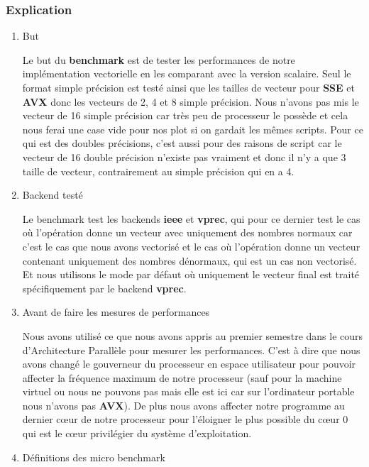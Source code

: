 \documentclass[11pt, letterpaper]{article}
\begin{document}
\subsubsection{Explication}
\label{sec:org72f10cb}
\begin{enumerate}
\item But
\label{sec:org0732b49}

Le but du \textbf{benchmark} est de tester les performances de notre implémentation
vectorielle en les comparant avec la version scalaire. Seul le format
simple précision est testé ainsi que les tailles de vecteur pour \textbf{SSE} et
\textbf{AVX} donc les vecteurs de 2, 4 et 8 simple précision. Nous n'avons pas mis
le vecteur de 16 simple précision car très peu de processeur le possède et
cela nous ferai une case vide pour nos plot si on gardait les mêmes
scripts. Pour ce qui est des doubles précisions, c'est aussi pour des
raisons de script car le vecteur de 16 double précision n'existe pas
vraiment et donc il n'y a que 3 taille de vecteur, contrairement au simple
précision qui en a 4.

\item Backend testé
\label{sec:orgb911297}

Le benchmark test les backends \textbf{ieee} et \textbf{vprec}, qui pour ce dernier test
le cas où l'opération donne un vecteur avec uniquement des nombres normaux
car c'est le cas que nous avons vectorisé et le cas où l'opération donne un
vecteur contenant uniquement des nombres dénormaux, qui est un cas non
vectorisé. Et nous utilisons le mode par défaut où uniquement le vecteur
final est traité spécifiquement par le backend \textbf{vprec}.

\item Avant de faire les mesures de performances
\label{sec:orgf031fa9}

Nous avons utilisé ce que nous avons appris au premier semestre dans le
cours d'Architecture Parallèle pour mesurer les performances. C'est à dire
que nous avons changé le gouverneur du processeur en espace utilisateur
pour pouvoir affecter la fréquence maximum de notre processeur (sauf pour la
machine virtuel ou nous ne pouvons pas mais elle est ici car sur
l'ordinateur portable nous n'avons pas \textbf{AVX}). De plus nous avons affecter
notre programme au dernier cœur de notre processeur pour l'éloigner le plus
possible du cœur 0 qui est le cœur privilégier du système d'exploitation.

\item Définitions des micro benchmark
\label{sec:org1fc8464}


\end{enumerate}
\end{document}
